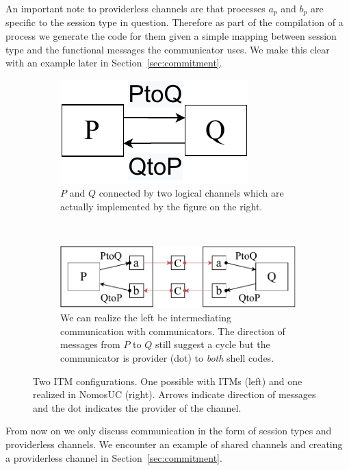 An important note to providerless channels are that processes $a_p$ and $b_p$ are specific to the session type in question.
Therefore as part of the compilation of a process we generate the code for them given a simple mapping between session type and the functional messages the communicator uses. We make this clear with an example later in Section~\ref{sec:commitment}.
\begin{figure}
	\begin{subfigure}{0.5\textwidth}
	\centering
	\includegraphics[scale=0.4]{figures/p_and_q.pdf}
	\caption{$P$ and $Q$ connected by two logical channels which are actually implemented by the figure on the right.}
	\label{fig:pandq}
	\end{subfigure}
	\\
	\begin{subfigure}{0.5\textwidth}
	\centering
	\includegraphics[scale=0.4]{figures/new_p_and_q.pdf}
	\caption{We can realize the left be intermediating communication with communicators. The direction of messages from $P$ to $Q$ still suggest a cycle but the communicator is provider (dot) to \emph{both} shell codes.}
	\label{fig:newpandq}
	\end{subfigure}
	\caption{Two ITM configurations. One possible with ITMs (left) and one realized in NomosUC (right). Arrows indicate direction of messages and the dot indicates the provider of the channel.}
	\vspace{-5mm}
\end{figure}

From now on we only discuss communication in the form of session types and providerless channels.
We encounter an example of shared channels and creating a providerless channel in Section~\ref{sec:commitment}.

